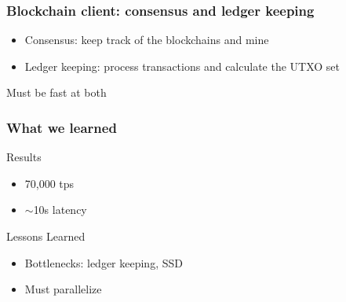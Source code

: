 \documentclass[aspectratio=169]{beamer}
\begin{document}
\begin{frame}
    \frametitle{Blockchain client: consensus and ledger keeping}
    \begin{itemize}
        \item \alert{Consensus}: keep track of the blockchains and mine
        \item \alert{Ledger keeping}: process transactions and calculate the UTXO set
    \end{itemize}
    \pause
    \alert{Must be fast at both}
\end{frame}

\begin{frame}
    \frametitle{What we learned}
    \begin{block}{Results}
    \begin{itemize}
        \item 70,000 tps
        \item $\sim$10s latency
    \end{itemize}
    \end{block}
    \pause
    \begin{block}{Lessons Learned}
        \begin{itemize}
            \item Bottlenecks: ledger keeping, SSD
            \item Must parallelize
        \end{itemize}
    \end{block}
\end{frame}
\end{document}
